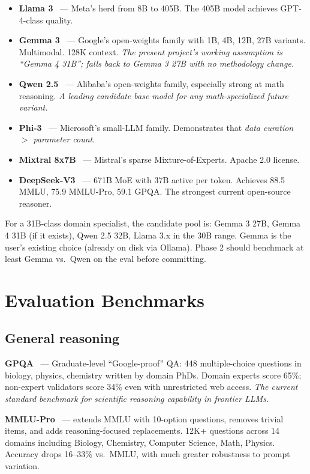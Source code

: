\documentclass[11pt]{article}
\begin{document}
\begin{itemize}
  \item \textbf{Llama 3}~\cite{dubey2024llama3} --- Meta's herd from 8B to 405B. The 405B model achieves GPT-4-class quality.
  \item \textbf{Gemma 3}~\cite{gemmateam2025gemma3} --- Google's open-weights family with 1B, 4B, 12B, 27B variants. Multimodal. 128K context. \emph{The present project's working assumption is ``Gemma 4 31B''; falls back to Gemma 3 27B with no methodology change.}
  \item \textbf{Qwen 2.5}~\cite{yang2024qwen25} --- Alibaba's open-weights family, especially strong at math reasoning. \emph{A leading candidate base model for any math-specialized future variant.}
  \item \textbf{Phi-3}~\cite{abdin2024phi3} --- Microsoft's small-LLM family. Demonstrates that \emph{data curation $>$ parameter count}.
  \item \textbf{Mixtral 8x7B}~\cite{jiang2024mixtral} --- Mistral's sparse Mixture-of-Experts. Apache 2.0 license.
  \item \textbf{DeepSeek-V3}~\cite{deepseekv3} --- 671B MoE with 37B active per token. Achieves 88.5 MMLU, 75.9 MMLU-Pro, 59.1 GPQA. The strongest current open-source reasoner.
\end{itemize}

For a 31B-class domain specialist, the candidate pool is: Gemma 3 27B, Gemma 4 31B (if it exists), Qwen 2.5 32B, Llama 3.x in the 30B range. Gemma is the user's existing choice (already on disk via Ollama). Phase 2 should benchmark at least Gemma vs.\ Qwen on the eval before committing.

\section{Evaluation Benchmarks}

\subsection{General reasoning}

\textbf{GPQA}~\cite{rein2023gpqa} --- Graduate-level ``Google-proof'' QA: 448 multiple-choice questions in biology, physics, chemistry written by domain PhDs. Domain experts score 65\%; non-expert validators score 34\% even with unrestricted web access. \emph{The current standard benchmark for scientific reasoning capability in frontier LLMs.}

\textbf{MMLU-Pro}~\cite{wang2024mmlupro} --- extends MMLU with 10-option questions, removes trivial items, and adds reasoning-focused replacements. 12K+ questions across 14 domains including Biology, Chemistry, Computer Science, Math, Physics. Accuracy drops 16--33\% vs.\ MMLU, with much greater robustness to prompt variation.
\end{document}
